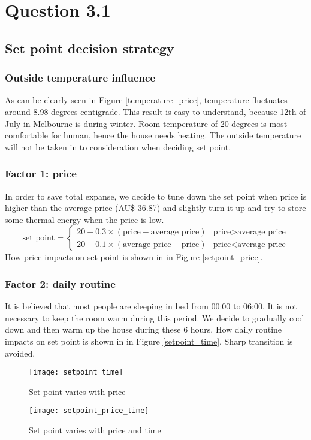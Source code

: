 \documentclass{article}
\newenvironment{homeworkProblem}[1]{
	\section*{#1}
	}{
}
\newenvironment{homeworkSection}[1]{
	\subsection*{#1}
	}{
}
\begin{document}
\begin{homeworkProblem}{Question 3.1}
\begin{homeworkSection}{Set point decision strategy}
\subsubsection*{Outside temperature influence}
As can be clearly seen in Figure \ref{temperature_price}, temperature fluctuates around 8.98 degrees centigrade. This result is easy to understand, because 12th of July in Melbourne is during winter. Room temperature of 20 degrees is most comfortable for human, hence the house needs heating. The outside temperature will not be taken in to consideration when deciding set point.

\subsubsection*{Factor 1: price}
In order to save total expanse, we decide to tune down the set point when price is higher than the average price (AU\$ 36.87) and slightly turn it up and try to store some thermal energy when the price is low.
\begin{equation}
\text{set point} =
\begin{cases}
20 - 0.3 \times (\text{price} - \text{average price}) & \text{price} > \text{average price}\\
20 + 0.1 \times (\text{average price} - \text{price}) & \text{price} < \text{average price}
\end{cases}
\end{equation}
How price impacts on set point is shown in in Figure \ref{setpoint_price}.

\subsubsection*{Factor 2: daily routine}
It is believed that most people are sleeping in bed from 00:00 to 06:00. It is not necessary to keep the room warm during this period. We decide to gradually cool down and then warm up the house during these 6 hours. How daily routine impacts on set point is shown in in Figure \ref{setpoint_time}. Sharp transition is avoided.

\begin{figure}[H]
\begin{minipage}[t]{0.5\linewidth}
\centering
\texttt{[image: setpoint\_time]}
\caption{Set point varies with price}
\label{setpoint_time}
\end{minipage}
\begin{minipage}[t]{0.5\linewidth}
\centering
\texttt{[image: setpoint\_price\_time]}
\caption{Set point varies with price and time}
\label{setpoint_price_time}
\end{minipage}
\end{figure}


\end{homeworkSection}
\end{homeworkProblem}
\end{document}
